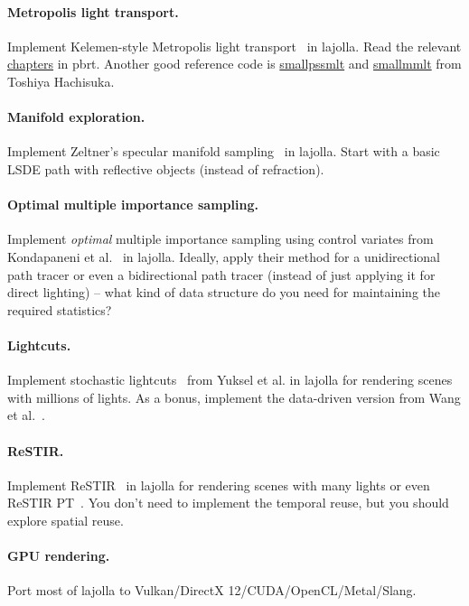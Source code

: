 \paragraph{Metropolis light transport.} Implement Kelemen-style Metropolis light transport~\cite{Kelemen:2002:SRM} in lajolla. Read the relevant \href{https://www.pbr-book.org/3ed-2018/Light_Transport_III_Bidirectional_Methods/Metropolis_Light_Transport}{chapters} in pbrt. Another good reference code is \href{https://cs.uwaterloo.ca/~thachisu/smallpssmlt.cpp}{smallpssmlt} and \href{https://cs.uwaterloo.ca/~thachisu/smallmmlt.cpp}{smallmmlt} from Toshiya Hachisuka.

\paragraph{Manifold exploration.} Implement Zeltner's specular manifold sampling~\cite{Zeltner:2020:SMS} in lajolla. Start with a basic LSDE path with reflective objects (instead of refraction).

\paragraph{Optimal multiple importance sampling.}
Implement \emph{optimal} multiple importance sampling using control variates from Kondapaneni et al.~\cite{Kondapaneni:2019:OMI} in lajolla.
Ideally, apply their method for a unidirectional path tracer or even a bidirectional path tracer (instead of just applying it for direct lighting) -- what kind of data structure do you need for maintaining the required statistics?

\paragraph{Lightcuts.}
Implement stochastic lightcuts~\cite{Yuksel:2019:SL} from Yuksel et al. in lajolla for rendering scenes with millions of lights.
As a bonus, implement the data-driven version from Wang et al.~\cite{Wang:2021:LCR}.

\paragraph{ReSTIR.}
Implement ReSTIR~\cite{Bitterli:2020:SRR} in lajolla for rendering scenes with many lights or even ReSTIR PT~\cite{Lin:2022:GRI}.
You don't need to implement the temporal reuse, but you should explore spatial reuse.

\paragraph{GPU rendering.}
Port most of lajolla to Vulkan/DirectX 12/CUDA/OpenCL/Metal/Slang.

